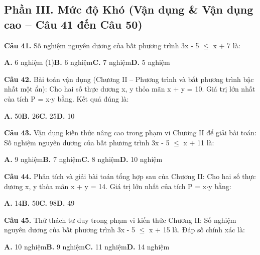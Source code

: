 \documentclass[11pt,a4paper]{article}
\begin{document}
\subsection*{\color{accent} Phần III. Mức độ Khó (Vận dụng \& Vận dụng cao -- Câu 41 đến Câu 50)}
\textbf{\color{primary} Câu 41.} Số nghiệm nguyên dương của bất phương trình 3x - 5 $\le$ x + 7 là:\par
\hspace*{1.5em}\textbf{A.} 6 nghiệm (1)\quad\quad \textbf{B.} 6 nghiệm\quad\quad \textbf{C.} 7 nghiệm\quad\quad \textbf{D.} 5 nghiệm\par\vspace{2pt}
\textbf{\color{primary} Câu 42.} Bài toán vận dụng (Chương II – Phương trình và bất phương trình bậc nhất một ẩn): Cho hai số thực dương x, y thỏa mãn x + y = 10. Giá trị lớn nhất của tích P = x$\cdot$y bằng. Kết quả đúng là:\par
\hspace*{1.5em}\textbf{A.} 50\quad\quad \textbf{B.} 26\quad\quad \textbf{C.} 25\quad\quad \textbf{D.} 10\par\vspace{2pt}
\textbf{\color{primary} Câu 43.} Vận dụng kiến thức nâng cao trong phạm vi Chương II để giải bài toán: Số nghiệm nguyên dương của bất phương trình 3x - 5 $\le$ x + 11 là:\par
\hspace*{1.5em}\textbf{A.} 9 nghiệm\quad\quad \textbf{B.} 7 nghiệm\quad\quad \textbf{C.} 8 nghiệm\quad\quad \textbf{D.} 10 nghiệm\par\vspace{2pt}
\textbf{\color{primary} Câu 44.} Phân tích và giải bài toán tổng hợp sau của Chương II: Cho hai số thực dương x, y thỏa mãn x + y = 14. Giá trị lớn nhất của tích P = x$\cdot$y bằng:\par
\hspace*{1.5em}\textbf{A.} 14\quad\quad \textbf{B.} 50\quad\quad \textbf{C.} 98\quad\quad \textbf{D.} 49\par\vspace{2pt}
\textbf{\color{primary} Câu 45.} Thử thách tư duy trong phạm vi kiến thức Chương II: Số nghiệm nguyên dương của bất phương trình 3x - 5 $\le$ x + 15 là. Đáp số chính xác là:\par
\hspace*{1.5em}\textbf{A.} 10 nghiệm\quad\quad \textbf{B.} 9 nghiệm\quad\quad \textbf{C.} 11 nghiệm\quad\quad \textbf{D.} 14 nghiệm\par\vspace{2pt}
\end{document}
